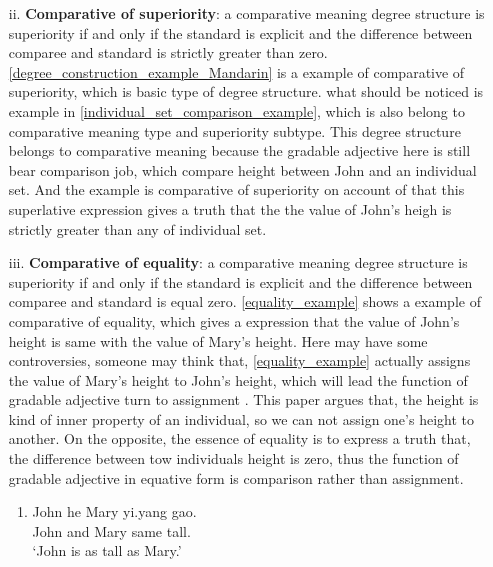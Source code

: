 \documentclass{ctexart}
\let \cite \parencite
\begin{document}
\begin{itemize}
\begin{itemize}
        \item[ii.] \textbf{Comparative of superiority}: a comparative meaning degree structure is superiority if and only if the standard is explicit and the difference between comparee and standard is strictly greater than zero. \ref{degree_construction_example_Mandarin} is a example of comparative of superiority, which is basic type of degree structure. what should be noticed is example in \ref{individual_set_comparison_example}, which is also belong to comparative meaning type and superiority subtype. This degree structure belongs to comparative meaning because the gradable adjective here is still bear comparison job, which compare height between John and an individual set. And the example is comparative of superiority on account of that this superlative expression gives a truth that the the value of John's heigh is strictly greater than any of individual set.
        
        \item[iii.] \textbf{Comparative of equality}: a comparative meaning degree structure is superiority if and only if the standard is explicit and the difference between comparee and standard is equal zero. \ref{equality_example} shows a example of comparative of equality, which gives a expression that the value of John's height is same with the value of Mary's height. Here may have some controversies, someone may think that, \ref{equality_example} actually assigns the value of Mary's height to John's height, which will lead the function of gradable adjective turn to assignment \cite{guo2012}. This paper argues that, the height is kind of inner property of an individual, so we can not assign one's height to another. On the opposite, the essence of equality is to express a truth that, the difference between tow individuals height is zero, thus the function of gradable adjective in equative form is comparison rather than assignment.
        
        \begin{enumerate}
            \item \label{equality_example}
            John he \enspace Mary \enspace yi.yang \enspace gao.\\
            John and Mary \enspace \enspace same \enspace \enspace tall.\\
            `John is as tall as Mary.'
        \end{enumerate}

    \end{itemize}   

\end{itemize}
\end{document}

